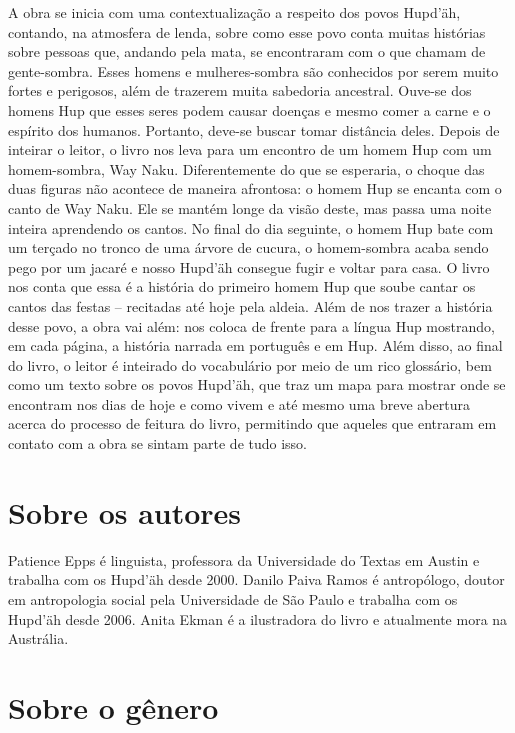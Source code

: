 \documentclass[11pt]{extarticle}
\begin{document}
A obra se inicia com uma contextualização a respeito dos povos Hupd'äh, contando, na atmosfera de lenda, sobre como esse povo conta muitas histórias sobre pessoas que, andando pela mata, se encontraram com o que chamam de gente-sombra. Esses homens e mulheres-sombra são conhecidos por serem muito fortes e perigosos, além de trazerem muita sabedoria ancestral. Ouve-se dos homens Hup que esses seres podem causar doenças e mesmo comer a carne e o espírito dos humanos. Portanto, deve-se buscar tomar distância deles. Depois de inteirar o leitor, o livro nos leva para um encontro de um homem Hup com um homem-sombra, Way Naku. Diferentemente do que se esperaria, o choque das duas figuras não acontece de maneira afrontosa: o homem Hup se encanta com o canto de Way Naku. Ele se mantém longe da visão deste, mas passa uma noite inteira aprendendo os cantos. No final do dia seguinte, o homem Hup bate com um terçado no tronco de uma árvore de cucura, o homem-sombra acaba sendo pego por um jacaré e nosso Hupd'äh consegue fugir e voltar para casa. O livro nos conta que essa é a história do primeiro homem Hup que soube cantar os cantos das festas -- recitadas até hoje pela aldeia. Além de nos trazer a história desse povo, a obra vai além: nos coloca de frente para a língua Hup mostrando, em cada página, a história narrada em português e em Hup. Além disso, ao final do livro, o leitor é inteirado do vocabulário por meio de um rico glossário, bem como um texto sobre os povos Hupd'äh, que traz um mapa para mostrar onde se encontram nos dias de hoje e como vivem e até mesmo uma breve abertura acerca do processo de feitura do livro, permitindo que aqueles que entraram em contato com a obra se sintam parte de tudo isso.

\section{Sobre os autores}

Patience Epps é linguista, professora da Universidade do Textas em Austin e trabalha com os Hupd'äh desde 2000. Danilo Paiva Ramos é antropólogo, doutor em antropologia social pela Universidade de São Paulo e trabalha com os Hupd'äh desde 2006. Anita Ekman é a ilustradora do livro e atualmente mora na Austrália. 


\section{Sobre o gênero}
\end{document}
